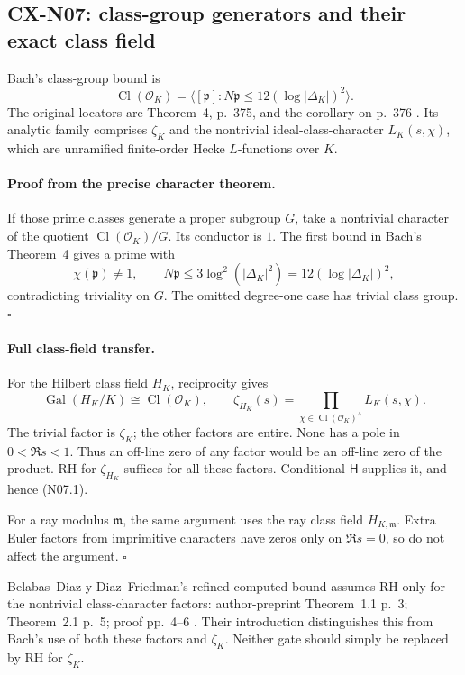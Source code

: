 \subsection{CX-N07: class-group generators and their exact class field}
\label{cx-n07}

Bach's class-group bound is
\[
        \operatorname{Cl}(\mathcal O_K)=
        \langle[\mathfrak p]:N\mathfrak p\leq
                             12(\log|\Delta_K|)^2\rangle .     \tag{N07.1}
\]
The original locators are Theorem~4, p.~375, and the corollary on p.~376
\cite{CXNBach90}. Its analytic family comprises \(\zeta_K\) and the
nontrivial ideal-class-character \(L_K(s,\chi)\), which are unramified
finite-order Hecke \(L\)-functions over \(K\).

\paragraph{Proof from the precise character theorem.}
If those prime classes generate a proper subgroup \(G\), take a
nontrivial character of the quotient
\(\operatorname{Cl}(\mathcal O_K)/G\). Its conductor is \(1\).
The first bound in Bach's Theorem~4 gives a prime with
\[
 \chi(\mathfrak p)\ne1,\qquad
 N\mathfrak p\leq3\log^2(|\Delta_K|^2)=12(\log|\Delta_K|)^2,
\]
contradicting triviality on \(G\). The omitted degree-one case has
trivial class group. \(\square\)

\paragraph{Full class-field transfer.}
For the Hilbert class field \(H_K\), reciprocity gives
\[
 \operatorname{Gal}(H_K/K)\cong\operatorname{Cl}(\mathcal O_K),
 \qquad
 \zeta_{H_K}(s)=
  \prod_{\chi\in\operatorname{Cl}(\mathcal O_K)^\wedge}L_K(s,\chi).
                                                                    \tag{N07.2}
\]
The trivial factor is \(\zeta_K\); the other factors are entire.
None has a pole in \(0<\Re s<1\). Thus an off-line zero of any factor
would be an off-line zero of the product. RH for \(\zeta_{H_K}\)
suffices for all these factors. Conditional \(\mathsf H\) supplies it,
and hence (N07.1).

For a ray modulus \(\mathfrak m\), the same argument uses the ray
class field \(H_{K,\mathfrak m}\). Extra Euler factors from imprimitive
characters have zeros only on \(\Re s=0\), so do not affect the argument.
\(\square\)

Belabas--Diaz y Diaz--Friedman's refined computed bound assumes RH
only for the nontrivial class-character factors: author-preprint
Theorem~1.1 p.~3; Theorem~2.1 p.~5; proof pp.~4--6
\cite{CXNBDF08}. Their introduction distinguishes this from Bach's use
of both these factors and \(\zeta_K\). Neither gate should simply be
replaced by RH for \(\zeta_K\).

